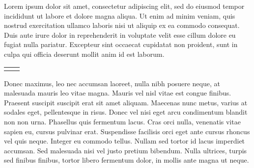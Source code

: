 \documentclass[draft,a4paper]{book}
\begin{document}
Lorem ipsum dolor sit amet, consectetur adipiscing elit, sed do eiusmod tempor
incididunt ut labore et dolore magna aliqua.
Ut enim ad minim veniam, quis nostrud exercitation ullamco laboris nisi ut
aliquip ex ea commodo consequat.
Duis aute irure dolor in reprehenderit in voluptate velit esse cillum dolore
eu fugiat nulla pariatur.
Excepteur sint occaecat cupidatat non proident, sunt in culpa qui officia
deserunt mollit anim id est laborum.

\begin{table}[htbp]
\centering
%
%
%
%
\begin{tabular}{c c}
 \begin{minipage}[][0.44\linewidth][t]{0.4\linewidth}
  
 \end{minipage}
&
%
%
%
 \begin{minipage}[][0.44\linewidth][t]{0.4\linewidth}
  
 \end{minipage}
\end{tabular}
\end{table}

%

Donec maximus, leo nec accumsan laoreet, nulla nibh posuere neque, at malesuada
mauris leo vitae magna. Mauris vel nisl vitae est congue finibus.
Praesent suscipit suscipit erat sit amet aliquam. Maecenas nunc metus, varius at
sodales eget, pellentesque in risus.
Donec vel nisi eget arcu condimentum blandit non non urna.
Phasellus quis fermentum lacus.
Cras orci nulla, venenatis vitae sapien eu, cursus pulvinar erat.
Suspendisse facilisis orci eget ante cursus rhoncus vel quis neque.
Integer eu commodo tellus.
Nullam sed tortor id lacus imperdiet accumsan.
Sed malesuada nisi vel justo pretium bibendum.
Nulla ultrices, turpis sed finibus finibus, tortor libero fermentum dolor,
in mollis ante magna ut neque.
\end{document}
